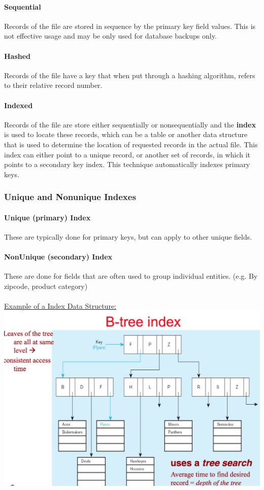 \documentclass[12pt]{article}
\begin{document}
\paragraph{Sequential} Records of the file are stored in sequence by the primary key field values. This is not effective usage and may be only used for database backups only.

\paragraph{Hashed} Records of the file have a key that when put through a hashing algorithm, refers to their relative record number.

\paragraph{Indexed} Records of the file are store either sequentially or nonsequentially and the \textbf{index} is used to locate these records, which can be a table or another data structure that is used to determine the location of requested records in the actual file. This index can either point to a unique record, or another set of records, in which it points to a secondary key index. This technique automatically indexes primary keys.

\subsubsection{Unique and Nonunique Indexes}

\paragraph{Unique (primary) Index} These are typically done for primary keys, but can apply to other unique fields.

\paragraph{NonUnique (secondary) Index} These are done for fields that are often used to group individual entities. (e.g. By zipcode, product category)
\\
\\
\underline{Example of a Index Data Structure:}\\
\includegraphics[scale=0.6]{lec6-8}\\
\end{document}

